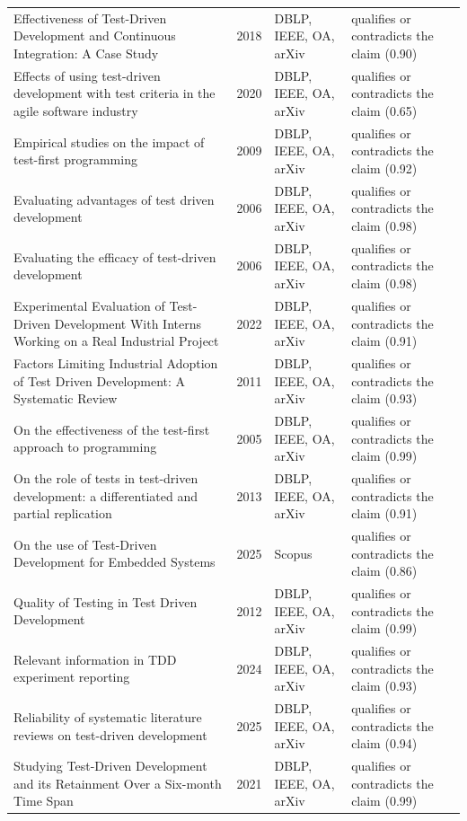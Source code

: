 \begin{longtable}{@{}%
  >{\raggedright\arraybackslash}p{}c%
  >{\raggedright\arraybackslash}p{}%
  >{\raggedright\arraybackslash}p{}@{}}
Effectiveness of Test-Driven Development and Continuous Integration: A Case Study & 2018 & DBLP, IEEE, OA, arXiv & qualifies or contradicts the claim (0.90) \\
Effects of using test-driven development with test criteria in the agile software industry & 2020 & DBLP, IEEE, OA, arXiv & qualifies or contradicts the claim (0.65) \\
Empirical studies on the impact of test-first programming & 2009 & DBLP, IEEE, OA, arXiv & qualifies or contradicts the claim (0.92) \\
Evaluating advantages of test driven development & 2006 & DBLP, IEEE, OA, arXiv & qualifies or contradicts the claim (0.98) \\
Evaluating the efficacy of test-driven development & 2006 & DBLP, IEEE, OA, arXiv & qualifies or contradicts the claim (0.98) \\
Experimental Evaluation of Test-Driven Development With Interns Working on a Real Industrial Project & 2022 & DBLP, IEEE, OA, arXiv & qualifies or contradicts the claim (0.91) \\
Factors Limiting Industrial Adoption of Test Driven Development: A Systematic Review & 2011 & DBLP, IEEE, OA, arXiv & qualifies or contradicts the claim (0.93) \\
On the effectiveness of the test-first approach to programming & 2005 & DBLP, IEEE, OA, arXiv & qualifies or contradicts the claim (0.99) \\
On the role of tests in test-driven development: a differentiated and partial replication & 2013 & DBLP, IEEE, OA, arXiv & qualifies or contradicts the claim (0.91) \\
On the use of Test-Driven Development for Embedded Systems & 2025 & Scopus & qualifies or contradicts the claim (0.86) \\
Quality of Testing in Test Driven Development & 2012 & DBLP, IEEE, OA, arXiv & qualifies or contradicts the claim (0.99) \\
Relevant information in TDD experiment reporting & 2024 & DBLP, IEEE, OA, arXiv & qualifies or contradicts the claim (0.93) \\
Reliability of systematic literature reviews on test-driven development & 2025 & DBLP, IEEE, OA, arXiv & qualifies or contradicts the claim (0.94) \\
Studying Test-Driven Development and its Retainment Over a Six-month Time Span & 2021 & DBLP, IEEE, OA, arXiv & qualifies or contradicts the claim (0.99) \\

\end{longtable}
